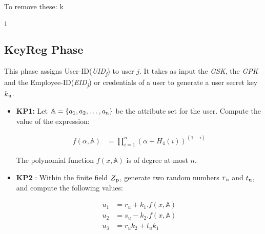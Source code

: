 \documentclass[conference]{IEEEtran}
\begin{document}
{\color{red} {To remove these:}}
k{\textsubscript{1}





\subsection{\textbf {KeyReg Phase}}
\label{sub:keygen}
This phase assigns User-ID(\emph{UID\textsubscript{j}}) to user $j$. It takes as input the \emph{GSK}, the \emph{GPK} and the Employee-ID(\emph{EID\textsubscript{j}}) or credentials of a user to generate a user secret key $k\textsubscript{u}$.
\begin{itemize}
    \item{\textbf{KP1:}} Let $\mathbb{A}  = \{a\textsubscript{1}, a\textsubscript{2}, \ldots, a\textsubscript{n}\}$ be the attribute set for the user. Compute the value of the expression:

          \begin{ceqn}
              \begin{align}
                  f(\alpha , \mathbb{A} ) & = \prod_{i=1}^{n}(\alpha + H_4(i))^{(1-i)}
              \end{align}
          \end{ceqn}

          The polynomial function $f(x, \mathbb{A} )$ is of degree at-most $n$.

    \item{\textbf {KP2}} : Within the finite field $Z\textsubscript{p}$, generate two random numbers $r\textsubscript{u}$ and $t\textsubscript{u}$, and compute the following values:
          \begin{ceqn}
              \begin{align}
                  u_1 & = r_u+k_1.f(x, \mathbb{A} )   \\
                  u_2 & = s_u - k_2.f(x, \mathbb{A} ) \\
                  u_3 & = r_u k_2 + t_u  k_1
              \end{align}
          \end{ceqn}


\end{itemize}}
\end{document}
